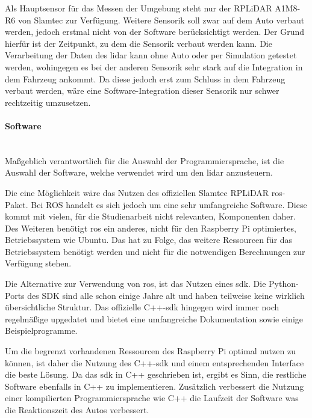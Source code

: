 Als Hauptsensor für das Messen der Umgebung steht nur der RPLiDAR A1M8-R6 von Slamtec zur Verfügung.
Weitere Sensorik soll zwar auf dem Auto verbaut werden, jedoch erstmal nicht von der Software berücksichtigt werden.
Der Grund hierfür ist der Zeitpunkt, zu dem die Sensorik verbaut werden kann.
Die Verarbeitung der Daten des \ac{lidar} kann ohne Auto oder per Simulation getestet werden, wohingegen es bei der anderen Sensorik sehr stark auf die Integration in dem Fahrzeug ankommt.
Da diese jedoch erst zum Schluss in dem Fahrzeug verbaut werden, wäre eine Software-Integration dieser Sensorik nur schwer rechtzeitig umzusetzen.

\paragraph{Software} \mbox{}\\
Maßgeblich verantwortlich für die Auswahl der Programmiersprache, ist die Auswahl der Software, welche verwendet wird um den \ac{lidar} anzusteuern.

Die eine Möglichkeit wäre das Nutzen des offiziellen Slamtec RPLiDAR \ac{ros}-Paket.
Bei ROS handelt es sich jedoch um eine sehr umfangreiche Software. 
Diese kommt mit vielen, für die Studienarbeit nicht relevanten, Komponenten daher.
Des Weiteren benötigt \ac{ros} ein anderes, nicht für den Raspberry Pi optimiertes, Betriebssystem wie Ubuntu.
Das hat zu Folge, das weitere Ressourcen für das Betriebssystem benötigt werden und nicht für die notwendigen Berechnungen zur Verfügung stehen.

Die Alternative zur Verwendung von \ac{ros}, ist das Nutzen eines \ac{sdk}.
Die Python-Ports des SDK sind alle schon einige Jahre alt und haben teilweise keine wirklich übersichtliche Struktur.
Das offizielle C++-\ac{sdk} hingegen wird immer noch regelmäßige upgedatet und bietet eine umfangreiche Dokumentation sowie einige Beispielprogramme.

Um die begrenzt vorhandenen Ressourcen des Raspberry Pi optimal nutzen zu können, ist daher die Nutzung des C++-\ac{sdk} und einem entsprechenden Interface die beste Lösung.
Da das \ac{sdk} in C++ geschrieben ist, ergibt es Sinn, die restliche Software ebenfalls in C++ zu implementieren.
Zusätzlich verbessert die Nutzung einer kompilierten Programmiersprache wie C++ die Laufzeit der Software was die Reaktionszeit des Autos verbessert.

\newpage
